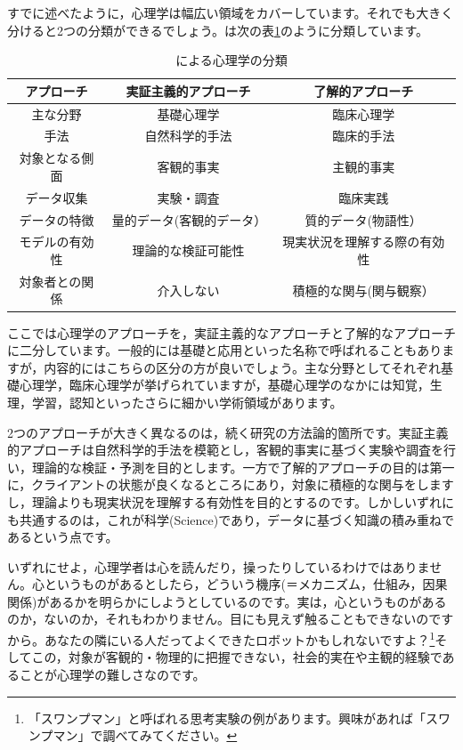 \documentclass{ltjsbook}
\begin{document}
すでに述べたように，心理学は幅広い領域をカバーしています。それでも大きく分けると2つの分類ができるでしょう。\citet{下山2001}は次の表\ref{tbl01_01}のように分類しています。

\begin{table}[hb]
    \centering
    \caption{\citet{下山2001}による心理学の分類}
    \begin{tabular}{ccc}
    アプローチ   & 実証主義的アプローチ    & 了解的アプローチ       \\\hline\hline
    主な分野    & 基礎心理学         & 臨床心理学          \\
    手法      & 自然科学的手法       & 臨床的手法          \\
    対象となる側面 & 客観的事実         & 主観的事実          \\
    データ収集   & 実験・調査         & 臨床実践           \\
    データの特徴  & 量的データ(客観的データ） & 質的データ(物語性）     \\
    モデルの有効性 & 理論的な検証可能性     & 現実状況を理解する際の有効性 \\
    対象者との関係 & 介入しない         & 積極的な関与(関与観察） \\\hline 
    \end{tabular}
    \label{tbl01_01}
\end{table}
ここでは心理学のアプローチを，実証主義的なアプローチと了解的なアプローチに二分しています。一般的には基礎と応用といった名称で呼ばれることもありますが，内容的にはこちらの区分の方が良いでしょう。主な分野としてそれぞれ基礎心理学，臨床心理学が挙げられていますが，基礎心理学のなかには知覚，生理，学習，認知といったさらに細かい学術領域があります。

2つのアプローチが大きく異なるのは，続く研究の方法論的箇所です。実証主義的アプローチは自然科学的手法を模範とし，客観的事実に基づく実験や調査を行い，理論的な検証・予測を目的とします。一方で了解的アプローチの目的は第一に，クライアントの状態が良くなるところにあり，対象に積極的な関与をしますし，理論よりも現実状況を理解する有効性を目的とするのです。しかしいずれにも共通するのは，これが科学(Science)であり，データに基づく知識の積み重ねであるという点です。

いずれにせよ，心理学者は心を読んだり，操ったりしているわけではありません。心というものがあるとしたら，どういう機序(＝メカニズム，仕組み，因果関係)があるかを明らかにしようとしているのです。実は，心というものがあるのか，ないのか，それもわかりません。目にも見えず触ることもできないのですから。あなたの隣にいる人だってよくできたロボットかもしれないですよ？\footnote{「スワンプマン」と呼ばれる思考実験の例があります。興味があれば「スワンプマン」で調べてみてください。}そしてこの，対象が客観的・物理的に把握できない，社会的実在や主観的経験であることが心理学の難しさなのです。
\end{document}
